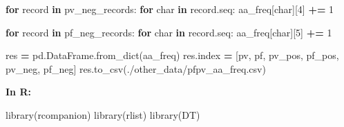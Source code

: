 \documentclass[
  11pt,
  oneside]{book}
\newenvironment{Shaded}{\begin{snugshade}}{\end{snugshade}}
\newcommand{\ControlFlowTok}[1]{\textcolor[rgb]{0.13,0.29,0.53}{\textbf{#1}}}
\newcommand{\DecValTok}[1]{\textcolor[rgb]{0.00,0.00,0.81}{#1}}
\newcommand{\FunctionTok}[1]{\textcolor[rgb]{0.00,0.00,0.00}{#1}}
\newcommand{\KeywordTok}[1]{\textcolor[rgb]{0.13,0.29,0.53}{\textbf{#1}}}
\newcommand{\NormalTok}[1]{#1}
\newcommand{\OperatorTok}[1]{\textcolor[rgb]{0.81,0.36,0.00}{\textbf{#1}}}
\newcommand{\StringTok}[1]{\textcolor[rgb]{0.31,0.60,0.02}{#1}}
\begin{document}
\begin{Shaded}
\begin{Highlighting}[]
\ControlFlowTok{for}\NormalTok{ record }\KeywordTok{in}\NormalTok{ pv\_neg\_records:}
    \ControlFlowTok{for}\NormalTok{ char }\KeywordTok{in}\NormalTok{ record.seq:}
\NormalTok{        aa\_freq[char][}\DecValTok{4}\NormalTok{] }\OperatorTok{+=} \DecValTok{1}

\ControlFlowTok{for}\NormalTok{ record }\KeywordTok{in}\NormalTok{ pf\_neg\_records:}
    \ControlFlowTok{for}\NormalTok{ char }\KeywordTok{in}\NormalTok{ record.seq:}
\NormalTok{        aa\_freq[char][}\DecValTok{5}\NormalTok{] }\OperatorTok{+=} \DecValTok{1}

\NormalTok{res }\OperatorTok{=}\NormalTok{ pd.DataFrame.from\_dict(aa\_freq)}
\NormalTok{res.index }\OperatorTok{=}\NormalTok{ [}\StringTok{\textquotesingle{}pv\textquotesingle{}}\NormalTok{, }\StringTok{\textquotesingle{}pf\textquotesingle{}}\NormalTok{, }\StringTok{\textquotesingle{}pv\_pos\textquotesingle{}}\NormalTok{, }\StringTok{\textquotesingle{}pf\_pos\textquotesingle{}}\NormalTok{, }\StringTok{\textquotesingle{}pv\_neg\textquotesingle{}}\NormalTok{, }\StringTok{\textquotesingle{}pf\_neg\textquotesingle{}}\NormalTok{]}
\NormalTok{res.to\_csv(}\StringTok{\textquotesingle{}./other\_data/pfpv\_aa\_freq.csv\textquotesingle{}}\NormalTok{)}
\end{Highlighting}
\end{Shaded}

\textbf{In R: }

\begin{Shaded}
\begin{Highlighting}[]
\FunctionTok{library}\NormalTok{(rcompanion)}
\FunctionTok{library}\NormalTok{(rlist)}
\FunctionTok{library}\NormalTok{(DT)}
\end{Highlighting}
\end{Shaded}
\end{document}
